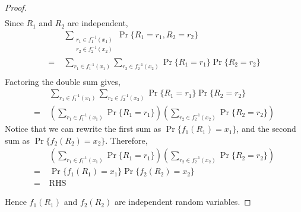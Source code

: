 \documentclass{article}
\begin{document}
\begin{proof}
\[\begin{aligned}
    \end{aligned}
    \]
    Since $R_1$ and $R_2$ are independent,
    \[
    \begin{aligned}
        &\sum_{\substack{r_1 \in f_1^{-1}(x_1)\\r_2 \in f_2^{-1}(x_2)}}\Pr\{R_1 = r_1, R_2 = r_2\} \\[6pt]
        =\;&\sum_{r_1 \in f_1^{-1}(x_1)}\sum_{r_2 \in f_2^{-1}(x_2)}\Pr\{R_1 = r_1\}\Pr\{R_2 = r_2\} \\[6pt]
    \end{aligned}
    \]
    Factoring the double sum gives,
    \[
    \begin{aligned}
        &\sum_{r_1 \in f_1^{-1}(x_1)}\sum_{r_2 \in f_2^{-1}(x_2)}\Pr\{R_1 = r_1\}\Pr\{R_2 = r_2\} \\[6pt]
        =\;&\left(\sum_{r_1 \in f_1^{-1}(x_1)}\Pr\{R_1 = r_1\}\right)
        \left(\sum_{r_2 \in f_2^{-1}(x_2)}\Pr\{R_2 = r_2\}\right)
    \end{aligned}
    \]
    Notice that we can rewrite the first sum as $\Pr\{f_1(R_1) = x_1\}$, and the second sum as 
    $\Pr\{f_2(R_2) = x_2\}$. Therefore, 
    \[
    \begin{aligned}
        &\left(\sum_{r_1 \in f_1^{-1}(x_1)}\Pr\{R_1 = r_1\}\right)
        \left(\sum_{r_2 \in f_2^{-1}(x_2)}\Pr\{R_2 = r_2\}\right) \\[6pt]
        =\;&\Pr\{f_1(R_1) = x_1\}\Pr\{f_2(R_2) = x_2\} \\[4pt]
        =\;&\text{RHS}
    \end{aligned}
    \]

    \medskip

    Hence $f_1(R_1)$ and $f_2(R_2)$ are independent random variables.
\end{proof}
\end{document}
